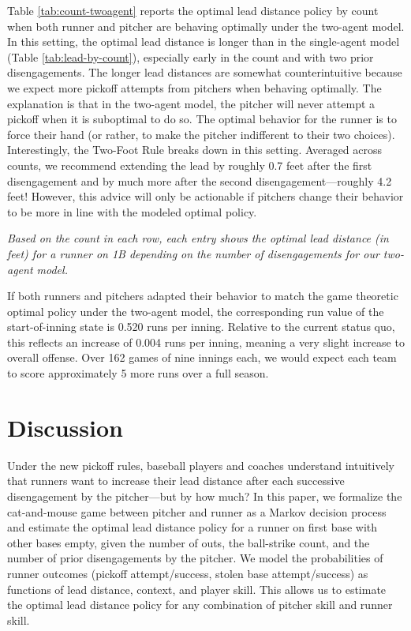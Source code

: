 \documentclass{article}
\begin{document}
      Table \ref{tab:count-twoagent} reports the optimal lead distance policy by count when both runner and pitcher are behaving optimally under the two-agent model. In this setting, the optimal lead distance is longer than in the single-agent model (Table \ref{tab:lead-by-count}), especially early in the count and with two prior disengagements. The longer lead distances are somewhat counterintuitive because we expect more pickoff attempts from pitchers when behaving optimally. The explanation is that in the two-agent model, the pitcher will never attempt a pickoff when it is suboptimal to do so. The optimal behavior for the runner is to force their hand (or rather, to make the pitcher indifferent to their two choices). Interestingly, the Two-Foot Rule breaks down in this setting. Averaged across counts, we recommend extending the lead by roughly 0.7 feet after the first disengagement and by much more after the second disengagement---roughly 4.2 feet! However, this advice will only be actionable if pitchers change their behavior to be more in line with the modeled optimal policy.
      
      \begin{table}[H]
        \centering
        
        \caption{
          \it Based on the count in each row, each entry shows the optimal lead distance (in feet) for a runner on 1B depending on the number of disengagements for our two-agent model.
        }
        \label{tab:count-twoagent}
      \end{table}

      If both runners and pitchers adapted their behavior to match the game theoretic optimal policy under the two-agent model, the corresponding run value of the start-of-inning state is 0.520 runs per inning. Relative to the current status quo, this reflects an increase of 0.004 runs per inning, meaning a very slight increase to overall offense. Over 162 games of nine innings each, we would expect each team to score approximately 5 more runs over a full season.

  \section{Discussion}

    Under the new pickoff rules, baseball players and coaches understand intuitively that runners want to increase their lead distance after each successive disengagement by the pitcher---but by how much? In this paper, we formalize the cat-and-mouse game between pitcher and runner as a Markov decision process and estimate the optimal lead distance policy for a runner on first base with other bases empty, given the number of outs, the ball-strike count, and the number of prior disengagements by the pitcher. We model the probabilities of runner outcomes (pickoff attempt/success, stolen base attempt/success) as functions of lead distance, context, and player skill. This allows us to estimate the optimal lead distance policy for any combination of pitcher skill and runner skill.
\end{document}
